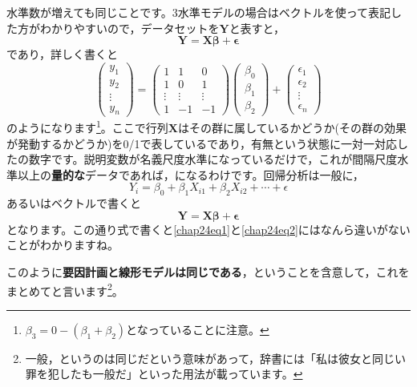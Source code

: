 \documentclass{ltjsbook}
\begin{document}
水準数が増えても同じことです。3水準モデルの場合はベクトルを使って表記した方がわかりやすいので，データセットを$\bm{Y}$と表すと，
\begin{equation}
    \bm{Y}=\bm{X\beta}+\bm{\epsilon}
    \label{chap24eq1}
\end{equation}
であり，詳しく書くと
\[
  \begin{pmatrix} y_1 \\ y_2 \\ \vdots \\ y_n \end{pmatrix}
   = 
   \begin{pmatrix} 1 & 1 & 0  \\ 
                    1 & 0 & 1 \\ 
                    \vdots  & \vdots & \vdots \\
                     1 & -1 & -1 \end{pmatrix}
   \begin{pmatrix} \beta_0 \\ \beta_1 \\ \beta_2 \end{pmatrix}
   + 
   \begin{pmatrix} \epsilon_1 \\ \epsilon_2 \\ \vdots \\ \epsilon_n \end{pmatrix} 
\]
のようになります\footnote{$\beta_3 = 0 - (\beta_1 + \beta_2)$となっていることに注意。}。ここで行列$\bm{X}$はその群に属しているかどうか(その群の効果が発動するかどうか)を0/1で表しているであり，有無という状態に一対一対応したの数字です。説明変数が名義尺度水準になっているだけで，これが間隔尺度水準以上の\textbf{量的な}データであれば，になるわけです。回帰分析は一般に，
\[ Y_i = \beta_0 + \beta_1 X_{i1} +  \beta_2 X_{i2} + \cdots + \epsilon \]
あるいはベクトルで書くと
\begin{equation}
    \bm{Y}=\bm{X\beta}+\bm{\epsilon}
    \label{chap24eq2}
\end{equation}
となります。この通り式で書くと\ref{chap24eq1}と\ref{chap24eq2}にはなんら違いがないことがわかりますね。

このように\textbf{要因計画と線形モデルは同じである}，ということを含意して，これをまとめてと言います\footnote{一般，というのは同じだという意味があって，辞書には「私は彼女と同じい罪を犯したも一般だ」といった用法が載っています。}。
\end{document}

